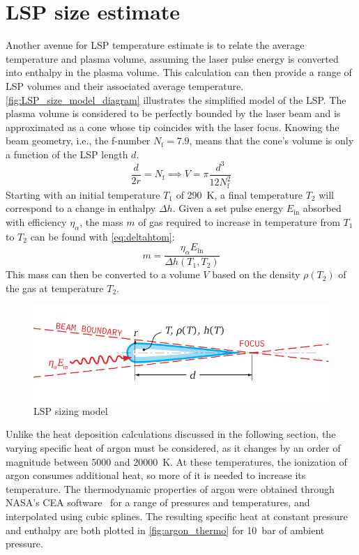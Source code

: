     \section{LSP size estimate}
        Another avenue for LSP temperature estimate is to relate the average temperature and plasma volume, assuming the laser pulse energy is converted into enthalpy in the plasma volume. This calculation can then provide a range of LSP volumes and their associated average temperature. \autoref{fig:LSP_size_model_diagram} illustrates the simplified model of the LSP. The plasma volume is considered to be perfectly bounded by the laser beam and is approximated as a cone whose tip coincides with the laser focus. Knowing the beam geometry, i.e., the f-number $N_\mathrm{f} = 7.9$, means that the cone's volume is only a function of the LSP length $d$.
        \begin{equation}
            \frac{d}{2r} = N_\mathrm{f} \implies V = \pi\frac{d^3}{12N_\mathrm{f}^2}
        \end{equation}
        Starting with an initial temperature $T_1$ of \qty{290}{K}, a final temperature $T_2$ will correspond to a change in enthalpy $\Delta h$. Given a set pulse energy $E_\mathrm{in}$ absorbed with efficiency $\eta_\alpha$, the mass $m$ of gas required to increase in temperature from $T_1$ to $T_2$ can be found with \autoref{eq:deltahtom}:
        \begin{equation}
            m = \frac{\eta_\alpha E_\mathrm{in}}{\Delta h(T_1, T_2)} \label{eq:deltahtom}
        \end{equation}
        This mass can then be converted to a volume $V$ based on the density $\rho(T_2)$ of the gas at temperature $T_2$.

        \begin{figure}[h]
            \centering
            \includegraphics[]{assets/4 models/LSP_sizemodel.pdf}
            \caption{LSP sizing model}
            \label{fig:LSP_size_model_diagram}
        \end{figure}

        Unlike the heat deposition calculations discussed in the following section, the varying specific heat of argon must be considered, as it changes by an order of magnitude between 5000 and \qty{20000}{K}. At these temperatures, the ionization of argon consumes additional heat, so more of it is needed to increase its temperature. The thermodynamic properties of argon were obtained through NASA's CEA software~\cite{gordonComputerProgramCalculation1994} for a range of pressures and temperatures, and interpolated using cubic splines. The resulting specific heat at constant pressure and enthalpy are both plotted in \autoref{fig:argon_thermo} for \qty{10}{bar} of ambient pressure.

